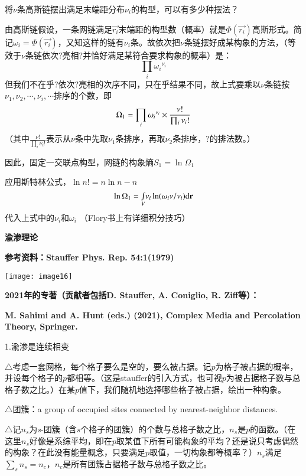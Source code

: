 \documentclass{article} %
\begin{document}
\noindent 将$\nu $条高斯链摆出满足末端距分布$\nu _{i} $的构型，可以有多少种摆法？

\noindent 由高斯链假设，一条网链满足$\overrightarrow{r_{i} }$末端距的构型数（概率）就是$\Phi \left(\overrightarrow{r_{i} }\right)$高斯形式。简记$\omega _{i} =\Phi \left(\overrightarrow{r_{i} }\right)$，又知这样的链有$\nu _{i} $条。故依次把$\nu $条链摆好成某构象的方法，（等效于$\nu $条链依次?亮相?并恰好满足某符合要求构象的概率）是：
\[\prod _{i}\omega _{i} {}^{\nu _{i} }  \] 
但我们不在乎?依次?亮相的次序不同，只在乎结果不同，故上式要乘以$\nu $条链按$\nu _{1} ,\nu _{2} ,\cdots ,\nu _{i} ,\cdots $排序的个数，即
\[{\rm \Omega }_{1} =\prod _{i}\omega _{i} {}^{\nu _{i} }  \times \frac{\nu !}{\prod _{i}\nu _{i} ! } \] 
（其中$\frac{\nu !}{\prod _{i}\nu _{i} ! } $表示从$\nu $条中先取$\nu _{1} $条排序，再取$\nu _{2} $条排序，?的排法数。）

\noindent 因此，固定一交联点构型，网链的构象熵$S_{1} =\ln \Omega _{1} $ 

\noindent 应用斯特林公式，$\ln n!=n\ln n-n$ 
\[\ln {\rm \Omega }_{1} ={\mathop{\smallint }\limits_{V}} \nu _{i} \ln (\omega _{i} \nu /\nu _{i} ){\rm d}\boldsymbol{\mathrm{r}}\] 
代入上式中的$\nu _{i} $和$\omega _{i} $   （Flory书上有详细积分技巧）

\noindent \eject 

\noindent \textbf{渝渗理论}

\noindent \textbf{参考资料：Stauffer Phys. Rep. 54:1(1979)}

\noindent \texttt{[image: image16]}\textbf{}

\noindent \textbf{2021年的专著（贡献者包括D. Stauffer, A. Coniglio, R. Ziff等）：}

\noindent \textbf{M. Sahimi and A. Hunt (eds.) (2021), Complex Media and Percolation Theory, Springer.}

\noindent 1.渝渗是连续相变

\noindent $\mathrm{\triangle}$考虑一套网格，每个格子要么是空的，要么被占据。记$p$为格子被占据的概率，并设每个格子的$p$都相等。（这是stauffer的引入方式，也可视$p$为被占据格子数与总格子数之比。）在某$p$值下，我们随机地选择哪些格子被占据，绘出一种构象。

\noindent $\mathrm{\triangle}$团簇：a group of occupied sites connected by nearest-neighbor distances.

\noindent $\mathrm{\triangle}$记$n_{s} $为\textit{s}-团簇（含$s$个格子的团簇）的个数与总格子数之比，$n_{s} $是$p$的函数。（在这里$n_{s} $好像是系综平均，即在$p$取某值下所有可能构象的平均？还是说只考虑偶然的构象？在此没有能量概念，只要满足$p$取值，一切构象都等概率？）$n_{s} $满足$\sum _{s}n_{s} =n_{c}  $，$n_{c} $是所有团簇占据格子数与总格子数之比。
\end{document}
